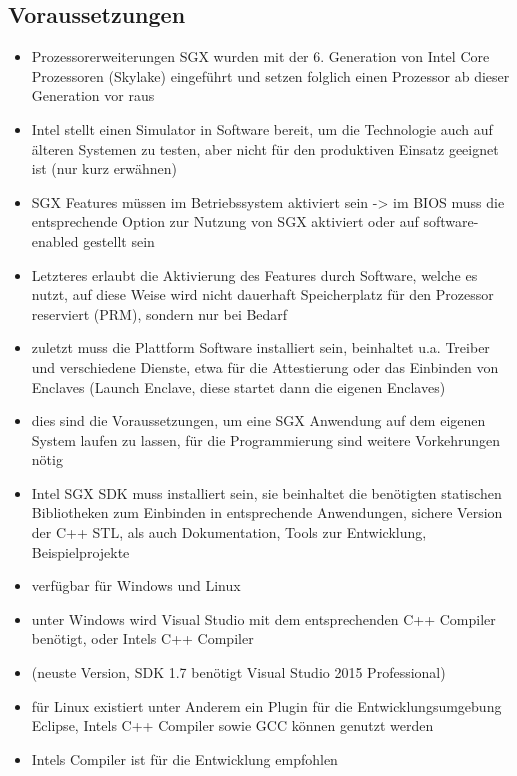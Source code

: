 \subsection{Voraussetzungen}
\begin{itemize}
	\item Prozessorerweiterungen SGX wurden mit der 6. Generation von Intel Core Prozessoren (Skylake) eingeführt und setzen folglich einen Prozessor ab dieser Generation vor raus
	\item Intel stellt einen Simulator in Software bereit, um die Technologie auch auf älteren Systemen zu testen, aber nicht für den produktiven Einsatz geeignet ist (nur kurz erwähnen)
	\item SGX Features müssen im Betriebssystem aktiviert sein -> im BIOS muss die entsprechende Option zur Nutzung von SGX aktiviert oder auf software-enabled gestellt sein
	\item Letzteres erlaubt die Aktivierung des Features durch Software, welche es nutzt, auf diese Weise wird nicht dauerhaft Speicherplatz für den Prozessor reserviert (PRM), sondern nur bei Bedarf
	\item zuletzt muss die Plattform Software installiert sein, beinhaltet u.a. Treiber und verschiedene Dienste, etwa für die Attestierung oder das Einbinden von Enclaves (Launch Enclave, diese startet dann die eigenen Enclaves)
	\item dies sind die Voraussetzungen, um eine SGX Anwendung auf dem eigenen System laufen zu lassen, für die Programmierung sind weitere Vorkehrungen nötig
	\item Intel SGX SDK muss installiert sein, sie beinhaltet die benötigten statischen Bibliotheken zum Einbinden in entsprechende Anwendungen, sichere Version der C++ STL, als auch Dokumentation, Tools zur Entwicklung, Beispielprojekte
	\item verfügbar für Windows und Linux
	\item unter Windows wird Visual Studio mit dem entsprechenden C++ Compiler benötigt, oder Intels C++ Compiler
	\item (neuste Version, SDK 1.7 benötigt Visual Studio 2015 Professional)
	\item für Linux existiert unter Anderem ein Plugin für die Entwicklungsumgebung Eclipse, Intels C++ Compiler sowie GCC können genutzt werden
	\item Intels Compiler ist für die Entwicklung empfohlen \cite{WinDev}
	
\end{itemize}
